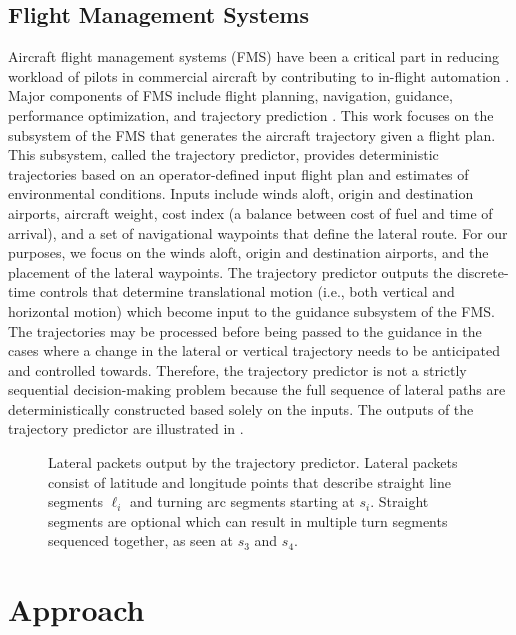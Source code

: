 \subsection{Flight Management Systems}
Aircraft flight management systems (FMS) have been a critical part in reducing workload of pilots in commercial aircraft by contributing to in-flight automation  \cite{fms_workload}.
Major components of FMS include flight planning, navigation, guidance, performance optimization, and trajectory prediction \cite{fms}. 
This work focuses on the subsystem of the FMS that generates the aircraft trajectory given a flight plan.
This subsystem, called the trajectory predictor, provides deterministic trajectories based on an operator-defined input flight plan and estimates of environmental conditions.
Inputs include winds aloft, origin and destination airports, aircraft weight, cost index (a balance between cost of fuel and time of arrival), and a set of navigational waypoints that define the lateral route.
For our purposes, we focus on the winds aloft, origin and destination airports, and the placement of the lateral waypoints.
The trajectory predictor outputs the discrete-time controls that determine translational motion (i.e., both vertical and horizontal motion) which become input to the guidance subsystem of the FMS.
The trajectories may be processed before being passed to the guidance in the cases where a change in the lateral or vertical trajectory needs to be anticipated and controlled towards.
Therefore, the trajectory predictor is not a strictly sequential decision-making problem because the full sequence of lateral paths are deterministically constructed based solely on the inputs.
The outputs of the trajectory predictor are illustrated in .

\begin{figure*}[!t]
\centering
\resizebox{0.78\textwidth}{!}{}
\caption{Lateral packets output by the trajectory predictor. Lateral packets consist of latitude and longitude points that describe straight line segments $\ell_i$ and turning arc segments starting at $s_i$. Straight segments are optional which can result in multiple turn segments sequenced together, as seen at $s_3$ and $s_4$.}
\label{fig:lateral_packets}
\end{figure*}



\section{Approach}
\label{sec:ast_approach}

